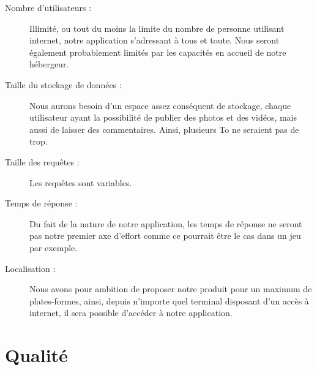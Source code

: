 \documentclass{life-fr}
\begin{document}
\begin{description}
  \item[Nombre d’utilisateurs :]
    Illimité, ou tout du moins la limite du nombre de personne utilisant internet, notre application s’adressant à tous et toute. Nous seront également probablement limités par les capacités en accueil de notre hébergeur.
  \item[Taille du stockage de données :]
    Nous aurons besoin d’un espace assez conséquent de stockage, chaque utilisateur ayant la possibilité de publier des photos et des vidéos, mais aussi de laisser des commentaires. Ainsi, plusieurs To ne seraient pas de trop.
  \item[Taille des requêtes :]
    Les requêtes sont variables.
  \item[Temps de réponse :]
    Du fait de la nature de notre application, les temps de réponse ne seront pas notre premier axe d’effort comme ce pourrait être le cas dans un jeu par exemple.
  \item[Localisation :]
    Nous avons pour ambition de proposer notre produit pour un maximum de plates-formes, ainsi, depuis n’importe quel terminal disposant d’un accès à internet, il sera possible d’accéder à notre application.
\end{description}


\chapter{Qualité}
\end{document}
